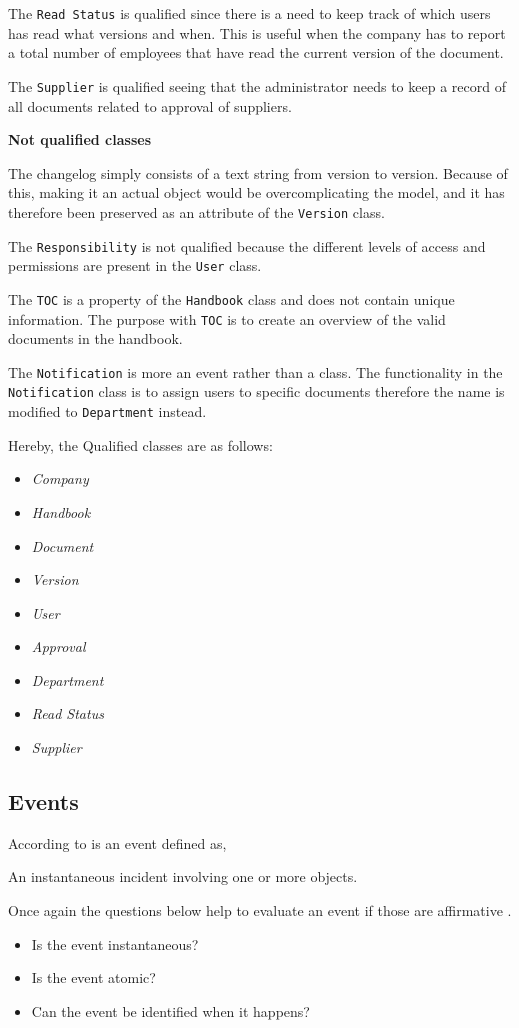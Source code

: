 The \texttt{Read Status} is qualified since there is a need to keep track of which users has read what versions and when.
This is useful when the company has to report a total number of employees that have read the current version of the document.

The \texttt{Supplier} is qualified seeing that the administrator needs to keep a record of all documents related to approval of suppliers.

\textbf{Not qualified classes}

The changelog simply consists of a text string from version to version.
Because of this, making it an actual object would be overcomplicating the model, and it has therefore been preserved as an attribute of the \texttt{Version} class.

The \texttt{Responsibility} is not qualified because the different levels of access and permissions are present in the \texttt{User} class.

The \texttt{TOC} is a property of the \texttt{Handbook} class and does not contain unique information.
The purpose with \texttt{TOC} is to create an overview of the valid documents in the handbook.

The \texttt{Notification} is more an event rather than a class.
The functionality in the \texttt{Notification} class is to assign users to specific documents therefore the name is modified to \texttt{Department} instead.

Hereby, the Qualified classes are as follows:
\begin{multicols}{4}
	\begin{itemize}
	\item \textit{Company}
	\item \textit{Handbook}
	\item \textit{Document}
	\item \textit{Version}
	\item \textit{User}
	\item \textit{Approval}
	\item \textit{Department}
	\item \textit{Read Status}
	\item \textit{Supplier}
	\end{itemize}
\end{multicols}

\subsection{Events} \label{sec:Events}
According to \citep[p.~53]{Rod-Aalborg} is an event defined as,
\begin{defn}\label{defn:Event}
An instantaneous incident involving one or more objects.
\end{defn}
Once again the questions below help to evaluate an event if those are affirmative \citep[p.~65]{Rod-Aalborg}.
\begin{itemize}
	\item Is the event instantaneous?
	\item Is the event atomic?
	\item Can the event be identified when it happens?
\end{itemize}

